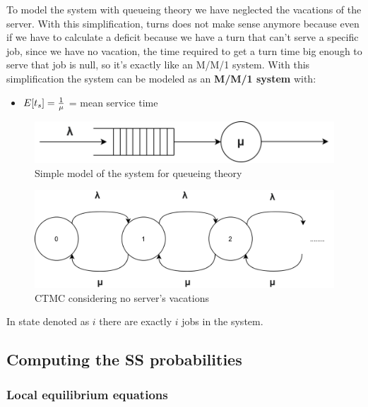 \documentclass{article}
\begin{document}
        To model the system with queueing theory we have neglected the vacations of the server. With this simplification, turns does not make sense anymore because even if we have to calculate a deficit because we have a turn that can't serve a specific job, since we have no vacation, the time required to get a turn time big enough to serve that job is null, so it's exactly like an M/M/1 system.
        \newline
        With this simplification the system can be modeled as an \textbf{M/M/1 system} with:
        \begin{itemize}
            \item $E[t_s] = {1 \over \mu}$ = mean service time
        \end{itemize}


    \begin{figure}[ht!]
        \centering
        \includegraphics[scale=0.2]{./images/system_queueing_theory}
        \caption{Simple model of the system for queueing theory}
        \label{fig:system_queueing_theory}
    \end{figure}
    
    \begin{figure}[ht!]
        \centering
        \includegraphics[scale=0.18]{./images/CTMC_no_vacations}
        \caption{CTMC considering no server's vacations}
        \label{fig:CTMC_no_vacations}
    \end{figure}
    
    In state denoted as $i$ there are exactly $i$ jobs in the system.

    \subsection{Computing the SS probabilities}
    
        \subsubsection{Local equilibrium equations}
            
\end{document}
